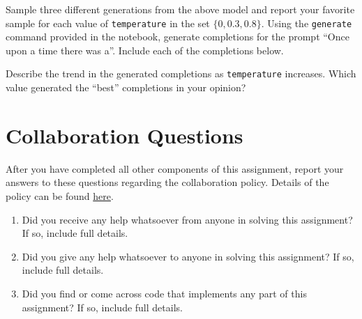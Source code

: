 \documentclass[11pt,addpoints,answers]{exam}
\begin{document}
\begin{questions}
\begin{parts}
\begin{subparts}
    \subpart[3] Sample three different generations from the above model and report your favorite sample for each value of \texttt{temperature} in the set $\{0, 0.3, 0.8\}$. Using the \texttt{generate} command provided in the notebook, generate completions for the prompt ``Once upon a time there was a''. Include each of the completions below. 

    
    \begin{your_solution}[title=\texttt{Temperature = 0}, height=3cm]
    \end{your_solution}
    
    \begin{your_solution}[title=\texttt{Temperature = 0.3}, height=3cm]
    \end{your_solution}
    
    \begin{your_solution}[title=\texttt{Temperature = 0.8}, height=3cm]
    \end{your_solution}

     \clearpage
    \subpart[1]Describe the trend in the generated completions as \texttt{temperature} increases. Which value generated the ``best'' completions in your opinion?

    \begin{your_solution}[height=4cm]
    \end{your_solution}
\end{subparts}

\end{parts}
    \newpage
    \end{questions}
\newpage
\section{Collaboration Questions}
After you have completed all other components of this assignment, report your answers to these questions regarding the collaboration policy. Details of the policy can be found \href{https://www.cs.cmu.edu/~mgormley/courses/10601/index.html#syllabus}{here}.
\begin{enumerate}
    \item Did you receive any help whatsoever from anyone in solving this assignment? If so, include full details.
    \item Did you give any help whatsoever to anyone in solving this assignment? If so, include full details.
    \item Did you find or come across code that implements any part of this assignment? If so, include full details.
\end{enumerate}
\end{document}
